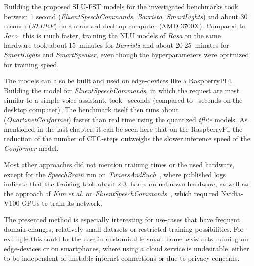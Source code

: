 \documentclass[a4paper]{article}
\begin{document}
Building the proposed SLU-FST models for the investigated benchmarks took between 1 second (\textit{FluentSpeechCommands, Barrista, SmartLights}) and about 30 seconds (\textit{SLURP}) on a standard desktop computer (AMD-3700X). 
Compared to \textit{Jaco}~\cite{JACO} this is much faster, training the NLU models of \textit{Rasa} on the same hardware took about \mbox{15 minutes} for \textit{Barrista} and about \mbox{20-25 minutes} for \textit{SmartLights} and \textit{SmartSpeaker}, even though the hyperparameters were optimized for training speed.

The models can also be built and used on edge-devices like a RaspberryPi\,4. Building the model for \textit{FluentSpeechCommands}, in which the request are most similar to a simple voice assistant, took \mbox{ seconds} (compared to \mbox{ seconds} on the desktop computer). The benchmark itself then runs about~ (\textit{Quartznet}\textit{Conformer}) faster than real time using the quantized \textit{tflite} models. As mentioned in the last chapter, it can be seen here that on the RaspberryPi, the reduction of the number of CTC-steps outweighs the slower inference speed of the \textit{Conformer} model.

Most other approaches did not mention training times or the used hardware, except for the \textit{SpeechBrain} run on \textit{Timers\-AndSuch}~\cite{TASSB}, where published logs indicate that the training took about \mbox{2-3 hours} on unknown hardware, as well as the approach of \textit{Kim et al.} on \textit{FluentSpeechCommands}~\cite{TKNDIS}, which required  Nvidia-V100 GPUs to train its network. 

\vspace{9pt}
The presented method is especially interesting for use-cases that have frequent domain changes, relatively small datasets or restricted training possibilities. For example this could be the case in customizable smart home assistants running on edge-devices or on smartphones, where using a cloud service is undesirable, either to be independent of unstable internet connections or due to privacy concerns.





\end{document}

